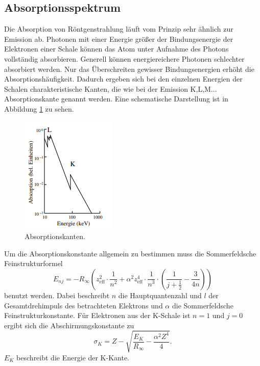 \subsection{Absorptionsspektrum}
Die Absorption von Röntgenstrahlung läuft vom Prinzip sehr ähnlich zur Emission ab. Photonen 
mit einer Energie größer der Bindungsenergie der Elektronen einer Schale können das Atom unter Aufnahme des Photons vollständig
absorbieren. Generell können energiereichere Photonen schlechter absorbiert werden. Nur das Überschreiten gewisser Bindungsenergien
erhöht die Absorptionshäufigkeit. Dadurch ergeben sich bei den einzelnen Energien der Schalen charakteristische Kanten, die wie bei
der Emission K,L,M... Absorptionskante genannt werden. Eine schematische Darstellung ist in 
Abbildung \ref{fig:Absorption} zu sehen.
\begin{figure}[H]
    \centering
    \includegraphics[scale=1.5]{content/Absorption.png}
    \caption{Absorptionskanten\cite{sample}.}
    \label{fig:Absorption}
\end{figure}

\noindent Um die Absorptionskonstante allgemein zu bestimmen muss die Sommerfeldsche Feinstrukturformel
\begin{equation}
    E_{nj}=-R_\infty \left(z_\text{eff}^2\cdot \frac{1}{n^2}+\alpha^2z_\text{eff}^4\cdot \frac{1}{n^3}\cdot\left(\frac{1}{j+\frac{1}{2}}-\frac{3}{4n}\right)\right)
    \label{eq:Sommerfeld}
\end{equation}
benutzt werden. Dabei beschreibt $n$ die Hauptquantenzahl und $l$ der Gesamtdrehimpuls des betrachteten Elektrons und $\alpha$ die Sommerfeldsche Feinstrukturkonstante.
Für Elektronen aus der K-Schale ist $n=1$ und $j=0$ ergibt sich die Abschirmungskonstante zu 
\begin{equation}
    \sigma_K=Z-\sqrt{\frac{E_K}{R_\infty}-\frac{\alpha^2Z^4}{4}}.
    \label{eq:Abschirm}
\end{equation} 
$E_K$ beschreibt die Energie der K-Kante.
